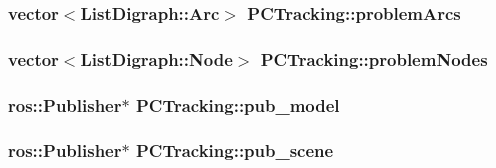 \hypertarget{class_p_c_tracking_a8a1d5993a52b155b865f01ce25d89347}{
\subsubsection[{problem\-Arcs}]{\setlength{\rightskip}{0pt plus 5cm}vector$<$\-List\-Digraph\-::\-Arc$>$ {\bf \-P\-C\-Tracking\-::problem\-Arcs}}}\label{class_p_c_tracking_a8a1d5993a52b155b865f01ce25d89347}
\hypertarget{class_p_c_tracking_aab4c50eb3b2f683084a01a32b279f07e}{
\subsubsection[{problem\-Nodes}]{\setlength{\rightskip}{0pt plus 5cm}vector$<$\-List\-Digraph\-::\-Node$>$ {\bf \-P\-C\-Tracking\-::problem\-Nodes}}}\label{class_p_c_tracking_aab4c50eb3b2f683084a01a32b279f07e}
\hypertarget{class_p_c_tracking_a049c7f8d8103c26527911ebd9b3bf999}{
\subsubsection[{pub\-\_\-model}]{\setlength{\rightskip}{0pt plus 5cm}ros\-::\-Publisher$\ast$ {\bf \-P\-C\-Tracking\-::pub\-\_\-model}}}\label{class_p_c_tracking_a049c7f8d8103c26527911ebd9b3bf999}
\hypertarget{class_p_c_tracking_ae092fc2f00b00b576039fb8da640fc89}{
\subsubsection[{pub\-\_\-scene}]{\setlength{\rightskip}{0pt plus 5cm}ros\-::\-Publisher$\ast$ {\bf \-P\-C\-Tracking\-::pub\-\_\-scene}}}\label{class_p_c_tracking_ae092fc2f00b00b576039fb8da640fc89}
